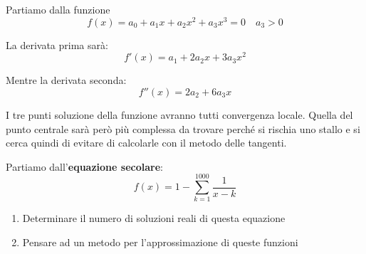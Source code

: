\begin{example}
	Partiamo dalla funzione
	\begin{equation*}
		f(x)=a_0+a_1x+a_2x^2+a_3x^3=0 \quad a_3 > 0
	\end{equation*}
	\begin{center}
	\end{center}
	La derivata prima sarà:
	\begin{equation*}
		f'(x)=a_1+2a_2x+3a_3x^2
	\end{equation*}
	\begin{center}
	\end{center}
	\newpage
	Mentre la derivata seconda:
	\begin{equation*}
		f''(x)=2a_2+6a_3x
	\end{equation*}
	\begin{center}
	\end{center}
	I tre punti soluzione della funzione avranno tutti convergenza locale. Quella del punto centrale sarà però più complessa da trovare perché si rischia uno stallo e si cerca quindi di evitare di calcolarle con il metodo delle tangenti.
\end{example}

\begin{example}
	Partiamo dall'\textbf{equazione secolare}:
	\begin{equation*}
		f(x)=1-\sum_{k=1}^{1000}\frac{1}{x-k}
	\end{equation*}
	\begin{enumerate}
		\item Determinare il numero di soluzioni reali di questa equazione
		\item Pensare ad un metodo per l'approssimazione di queste funzioni
	\end{enumerate}
\end{example}